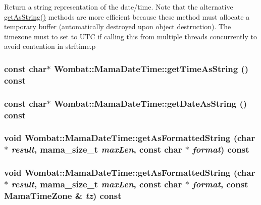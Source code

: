 Return a string representation of the date/time. Note that the alternative \hyperlink{classWombat_1_1MamaDateTime_a71d88aab06c9b370d39dca53ab200894}{getAsString()} methods are more efficient because these method must allocate a temporary buffer (automatically destroyed upon object destruction). The timezone must to set to UTC if calling this from multiple threads concurrently to avoid contention in strftime.p \hypertarget{classWombat_1_1MamaDateTime_a6f48574bcc00a4cab6753a7a91d78743}{
\subsubsection[{getTimeAsString}]{\setlength{\rightskip}{0pt plus 5cm}const char$\ast$ Wombat::MamaDateTime::getTimeAsString () const}}
\label{classWombat_1_1MamaDateTime_a6f48574bcc00a4cab6753a7a91d78743}
\hypertarget{classWombat_1_1MamaDateTime_abacd2e3cbcf824f61437099138197c9a}{
\subsubsection[{getDateAsString}]{\setlength{\rightskip}{0pt plus 5cm}const char$\ast$ Wombat::MamaDateTime::getDateAsString () const}}
\label{classWombat_1_1MamaDateTime_abacd2e3cbcf824f61437099138197c9a}
\hypertarget{classWombat_1_1MamaDateTime_ad6ee818253f878732d2cd487e44fe962}{
\subsubsection[{getAsFormattedString}]{\setlength{\rightskip}{0pt plus 5cm}void Wombat::MamaDateTime::getAsFormattedString (char $\ast$ {\em result}, \/  {\bf mama\_\-size\_\-t} {\em maxLen}, \/  const char $\ast$ {\em format}) const}}
\label{classWombat_1_1MamaDateTime_ad6ee818253f878732d2cd487e44fe962}
\hypertarget{classWombat_1_1MamaDateTime_acfed61cbe6e7701ef883049693b6b0ae}{
\subsubsection[{getAsFormattedString}]{\setlength{\rightskip}{0pt plus 5cm}void Wombat::MamaDateTime::getAsFormattedString (char $\ast$ {\em result}, \/  {\bf mama\_\-size\_\-t} {\em maxLen}, \/  const char $\ast$ {\em format}, \/  const {\bf MamaTimeZone} \& {\em tz}) const}}
